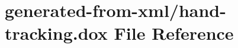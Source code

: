 \hypertarget{hand-tracking_8dox}{}\section{generated-\/from-\/xml/hand-\/tracking.dox File Reference}
\label{hand-tracking_8dox}
